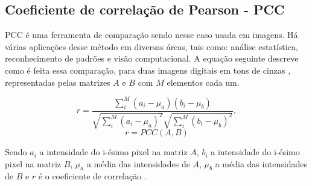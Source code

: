 \begin{comment}

\subsection{THE PEARSON CORRELATION COEFFICIENT}

$PCC$ is used in statistical analyses, pattern recognition and computer vision. 
It can be used to comparing two images in an object recognition system. 
The following equation describes the $PCC$ method for two gray scale digital images\cite{Eugene},
represented by the matrices $A$ and $B$ with $M$ elements each one,
\begin{equation}
r = \frac{\sum \limits_{i}^{M} (a_i-\mu_a)(b_i-\mu_b)}{\sqrt{\sum \limits_{i}^{M} (a_i-\mu_a)^2} \sqrt{\sum\limits_{i}^{M} (b_i-\mu_b)^2}},
\end{equation}
\begin{equation}\label{eq:PCC}
 r=PCC(A,B)
\end{equation}

where $a_i$ is the intensity of the i-th pixel in the  matrix $A$, 
$b_i$ is the intensity of the i-th pixel in the matrix $B$, 
$\mu_a$ is the mean intensity of $A$,
$\mu_b$ is the mean intensity of $B$ and
$r$ is the correlation coefficient \cite{Miranda Neto}.

\end{comment}



\subsection{Coeficiente de correlação de Pearson - PCC}

PCC é uma ferramenta de comparação sendo nesse caso usada em imagens. Há várias aplicações desse método 
em diversas áreas, tais como: análise estatística, reconhecimento de padrões e visão computacional. 
A equação seguinte descreve como é feita essa comparação, para duas imagens digitais 
em tons de cinzas \cite{Eugene}, representadas pelas matrizes $A$ e $B$ com $M$ elementos cada um.

\begin{equation}
r = \frac{\sum \limits_{i}^{M} (a_i-\mu_a)(b_i-\mu_b)}{\sqrt{\sum \limits_{i}^{M} (a_i-\mu_a)^2} \sqrt{\sum\limits_{i}^{M} (b_i-\mu_b)^2}},
\end{equation}
\begin{equation}\label{eq:PCC}
 r=PCC(A,B)
\end{equation}

Sendo $a_i$ a intensidade do i-ésimo pixel na matriz $A$, $b_i$ a intensidade do i-ésimo pixel na matriz
$B$, $\mu_a$ a média das intensidades de $A$, $\mu_b$ a média das intensidades de $B$ e $r$ é o coeficiente
de correlação \cite{Miranda Neto}.

